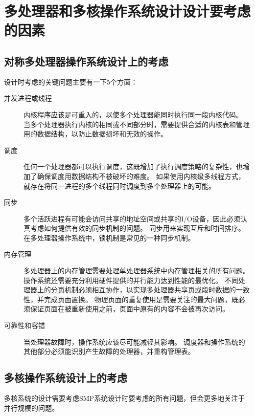
\section{多处理器和多核操作系统设计设计要考虑的因素}
{
    \subsection{对称多处理器操作系统设计上的考虑}
    {
        设计时考虑的关键问题主要有一下5个方面：

        \begin{description}
            \item[并发进程或线程]
            {
                内核程序应该是可重入的，以使多个处理器能同时执行同一段内核代码。
                当多个处理器执行内核的相同或不同部分时，需要提供合适的内核表和管理用的数据结构，以防止数据损坏和无效的操作。
            }
            \item[调度]
            {
                任何一个处理器都可以执行调度，这既增加了执行调度策略的复杂性，也增加了确保调度用数据结构不被破坏的难度。
                如果使用内核级多线程方式，就存在将同一进程的多个线程同时调度到多个处理器上的可能。
            }
            \item[同步]
            {
                多个活跃进程有可能会访问共享的地址空间或共享的I/O设备，因此必须认真考虑如何提供有效的同步机制的问题。
                同步用来实现互斥和时间排序。
                在多处理器操作系统中，锁机制是常见的一种同步机制。
            }
            \item[内存管理]
            {
                多处理器上的内存管理需要处理单处理器系统中内存管理相关的所有问题。
                操作系统还需要充分利用硬件提供的并行能力达到性能的最优化。
                不同处理器上的分页机制必须相互协作，以实现多处理器共享页或段时数据的一致性，并完成页面置换。
                物理页面的重复使用是需要关注的最大问题，既必须保证页面在被重新使用之前，页面中原有的内容不会被再次访问。
            }
            \item[可靠性和容错]
            {
                当处理器故障时，操作系统应该尽可能减轻其影响。
                调度器和操作系统的其他部分必须能识别产生故障的处理器，并重构管理表。
            }
        \end{description}
    }

    \subsection{多核操作系统设计上的考虑}
    {
        多核系统的设计需要考虑SMP系统设计时要考虑的所有问题，但会更多地关注于并行规模的问题。

}}

